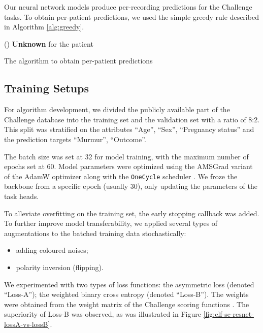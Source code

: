

Our neural network models produce per-recording predictions for the Challenge tasks. To obtain per-patient predictions, we used the simple greedy rule described in Algorithm \ref{alg:greedy}.

\begin{algorithm}
\SetInd{0.2em}{2em}
\Else(){
    \textbf{Unknown} for the patient\;
}
\caption{The algorithm to obtain per-patient predictions}\label{alg:greedy}
\end{algorithm}

\subsection{Training Setups}
\label{subsec:training}

For algorithm development, we divided the publicly available part of the Challenge database into the training set and the validation set with a ratio of 8:2. This split was stratified on the attributes ``Age'', ``Sex'', ``Pregnancy status'' and the prediction targets ``Murmur'', ``Outcome''.

The batch size was set at 32 for model training, with the maximum number of epochs set at 60. Model parameters were optimized using the AMSGrad variant of the AdamW optimizer \cite{adamw_amsgrad} along with the \texttt{OneCycle} scheduler \cite{smith2019one_cycle}. We froze the backbone from a specific epoch (usually 30), only updating the parameters of the task heads.

To alleviate overfitting on the training set, the early stopping callback was added. To further improve model transferability, we applied several types of augmentations to the batched training data stochastically:
\begin{itemize}
    \item adding coloured noises;
    \item polarity inversion (flipping).
\end{itemize}

We experimented with two types of loss functions: the asymmetric loss (denoted ``Loss-A''); the weighted binary cross entropy (denoted ``Loss-B''). The weights were obtained from the weight matrix of the Challenge scoring functions \cite{cinc2022}. The superiority of Loss-B was observed, as was illustrated in Figure \ref{fig:clf-se-resnet-lossA-vs-lossB}.

